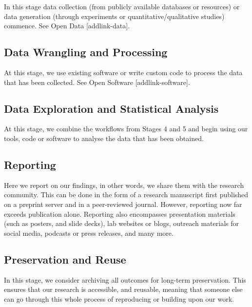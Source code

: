 \documentclass[
  letterpaper,
  DIV=11,
  numbers=noendperiod]{scrreport}
\begin{document}
In this stage data collection (from publicly available databases or
resources) or data generation (through experiments or
quantitative/qualitative studies) commence. See Open Data
{[}addlink-data{]}.

\hypertarget{data-wrangling-and-processing}{%
\subsection{Data Wrangling and
Processing}\label{data-wrangling-and-processing}}

At this stage, we use existing software or write custom code to process
the data that has been collected. See Open Software
{[}addlink-software{]}.

\hypertarget{data-exploration-and-statistical-analysis}{%
\subsection{Data Exploration and Statistical
Analysis}\label{data-exploration-and-statistical-analysis}}

At this stage, we combine the workflows from Stages 4 and 5 and begin
using our tools, code or software to analyse the data that has been
obtained.

\hypertarget{reporting}{%
\subsection{Reporting}\label{reporting}}

Here we report on our findings, in other words, we share them with the
research community. This can be done in the form of a research
manuscript first published on a preprint server and in a peer-reviewed
journal. However, reporting now far exceeds publication alone. Reporting
also encompasses presentation materials (such as posters, and slide
decks), lab websites or blogs, outreach materials for social media,
podcasts or press releases, and many more.

\hypertarget{preservation-and-reuse}{%
\subsection{Preservation and Reuse}\label{preservation-and-reuse}}

In this stage, we consider archiving all outcomes for long-term
preservation. This ensures that our research is accessible, and
reusable, meaning that someone else can go through this whole process of
reproducing or building upon our work.
\end{document}
